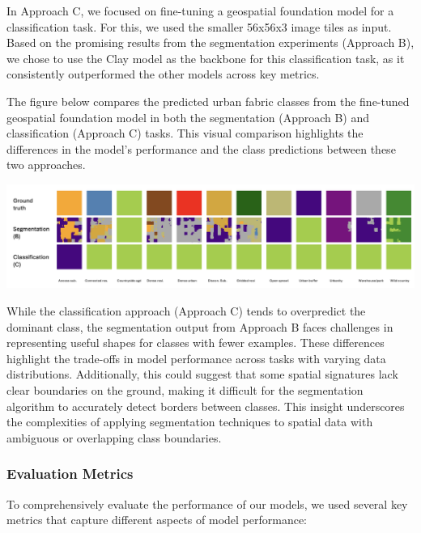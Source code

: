 \documentclass[
  letterpaper,
  DIV=11,
  numbers=noendperiod]{scrartcl}
\begin{document}
In Approach C, we focused on fine-tuning a geospatial foundation model
for a classification task. For this, we used the smaller 56x56x3 image
tiles as input. Based on the promising results from the segmentation
experiments (Approach B), we chose to use the Clay model as the backbone
for this classification task, as it consistently outperformed the other
models across key metrics.

The figure below compares the predicted urban fabric classes from the
fine-tuned geospatial foundation model in both the segmentation
(Approach B) and classification (Approach C) tasks. This visual
comparison highlights the differences in the model's performance and the
class predictions between these two approaches.

\begin{center}
\includegraphics[width=6.25in,height=\textheight,keepaspectratio]{../figures/algo_design/comparison_B_C.png}
\end{center}

While the classification approach (Approach C) tends to overpredict the
dominant class, the segmentation output from Approach B faces challenges
in representing useful shapes for classes with fewer examples. These
differences highlight the trade-offs in model performance across tasks
with varying data distributions. Additionally, this could suggest that
some spatial signatures lack clear boundaries on the ground, making it
difficult for the segmentation algorithm to accurately detect borders
between classes. This insight underscores the complexities of applying
segmentation techniques to spatial data with ambiguous or overlapping
class boundaries.

\subsubsection{Evaluation Metrics}\label{evaluation-metrics}

To comprehensively evaluate the performance of our models, we used
several key metrics that capture different aspects of model performance:
\end{document}
